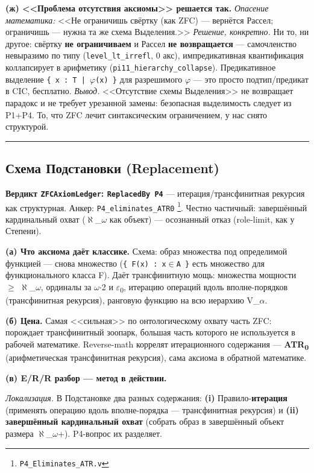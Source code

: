 \documentclass[11pt,a4paper]{article}
\begin{document}
\textbf{(ж) <<Проблема отсутствия аксиомы>> решается так.} \emph{Опасение математика:} <<Не ограничишь свёртку (как ZFC) --- вернётся Рассел; ограничишь --- нужна та же схема Выделения.>> \emph{Решение, конкретно.} Ни то, ни другое: свёртку \textbf{не ограничиваем} и Рассел \textbf{не возвращается} --- самочленство невыразимо по типу (\texttt{level\_\allowbreak{}lt\_\allowbreak{}irrefl}, 0 акс), импредикативная квантификация коллапсирует в арифметику (\texttt{pi11\_\allowbreak{}hierarchy\_\allowbreak{}collapse}). Предикативное выделение \texttt{\{ x : T | $\varphi$(x) \}} для разрешимого $\varphi$ --- это просто подтип/предикат в CIC, бесплатно. \emph{Вывод.} <<Отсутствие схемы Выделения>> не возвращает парадокс и не требует урезанной замены: безопасная выделимость следует из P1+P4. То, что ZFC лечит синтаксическим ограничением, у нас снято структурой.

\bigskip\hrule\bigskip

\subsection{Схема Подстановки (Replacement)}

\textbf{Вердикт \texttt{ZFCAxiom\allowbreak{}Ledger}: \texttt{Replaced\allowbreak{}By P4}} --- итерация/трансфинитная рекурсия как структурная. Анкер: \texttt{P4\_\allowbreak{}eliminates\_\allowbreak{}ATR0} \footnote{\texttt{P4\_\allowbreak{}Eliminates\_\allowbreak{}ATR.v}}. Честно частичный: завершённый кардинальный охват ($\aleph$\_$\omega$ как объект) --- осознанный отказ (role-limit, как у Степени).

\textbf{(а) Что аксиома даёт классике.} Схема: образ множества под определимой функцией --- снова множество (\texttt{\{ F(x) : x$\in$A \}} есть множество для функционального класса F). Даёт трансфинитную мощь: множества мощности $\ge$ $\aleph$\_$\omega$, ординалы за $\omega$$\cdot$2 и $\varepsilon$\textsubscript{0}, итерацию операций вдоль вполне-порядков (трансфинитная рекурсия), ранговую функцию на всю иерархию V\_$\alpha$.

\textbf{(б) Цена.} Самая <<сильная>> по онтологическому охвату часть ZFC: порождает трансфинитный зоопарк, большая часть которого не используется в рабочей математике. Reverse-math коррелят итерационного содержания --- \textbf{ATR\textsubscript{0}} (арифметическая трансфинитная рекурсия), сама аксиома в обратной математике.

\textbf{(в) E/R/R разбор --- метод в действии.}

\emph{Локализация.} В Подстановке два разных содержания: \textbf{(i)} Правило-\textbf{итерация} (применять операцию вдоль вполне-порядка --- трансфинитная рекурсия) и \textbf{(ii)} \textbf{завершённый кардинальный охват} (собрать образ в завершённый объект размера $\aleph$\_$\omega$+). P4-вопрос их разделяет.
\end{document}
